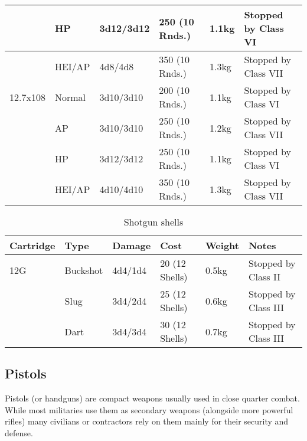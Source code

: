 \begin{table}
\begin{center}
\begin{tabular}{| l | l | l | l | l | l |}
      \,       & HP      & 3d12/3d12  & 250 (10 Rnds.) & 1.1kg & Stopped by Class VI \\ \hline
      \,       & HEI/AP  & 4d8/4d8    & 350 (10 Rnds.) & 1.3kg & Stopped by Class VII \\ \hline
      12.7x108 & Normal  & 3d10/3d10  & 200 (10 Rnds.) & 1.1kg & Stopped by Class VI \\ \hline
      \,       & AP      & 3d10/3d10  & 250 (10 Rnds.) & 1.2kg & Stopped by Class VII \\ \hline
      \,       & HP      & 3d12/3d12  & 250 (10 Rnds.) & 1.1kg & Stopped by Class VI \\ \hline
      \,       & HEI/AP  & 4d10/4d10  & 350 (10 Rnds.) & 1.3kg & Stopped by Class VII \\ \hline

    \end{tabular}
  \end{center}
\end{table}

\begin{table}
  \caption{Shotgun shells}
  \label{tab:ShotgunShells}
  \begin{center}
    \begin{tabular}{| l | l | l | l | l | l |}
      \hline
      \textbf{Cartridge}  & \textbf{Type}   & \textbf{Damage} &
      \textbf{Cost} & \textbf{Weight} & \textbf{Notes}        \\ \hline

      12G     & Buckshot & 4d4/1d4 & 20 (12 Shells) & 0.5kg & Stopped by Class II \\ \hline
      \,      & Slug     & 3d4/2d4 & 25 (12 Shells) & 0.6kg & Stopped by Class III \\ \hline
      \,      & Dart     & 3d4/3d4 & 30 (12 Shells) & 0.7kg & Stopped by Class III \\ \hline

    \end{tabular}
  \end{center}
\end{table}

\subsection{Pistols}
\label{sub:9-Pistols}

Pistols (or handguns) are compact weapons usually used in close quarter combat.
While most militaries use them as secondary weapons (alongside more powerful
rifles) many civilians or contractors rely on them mainly for their security
and defense.

